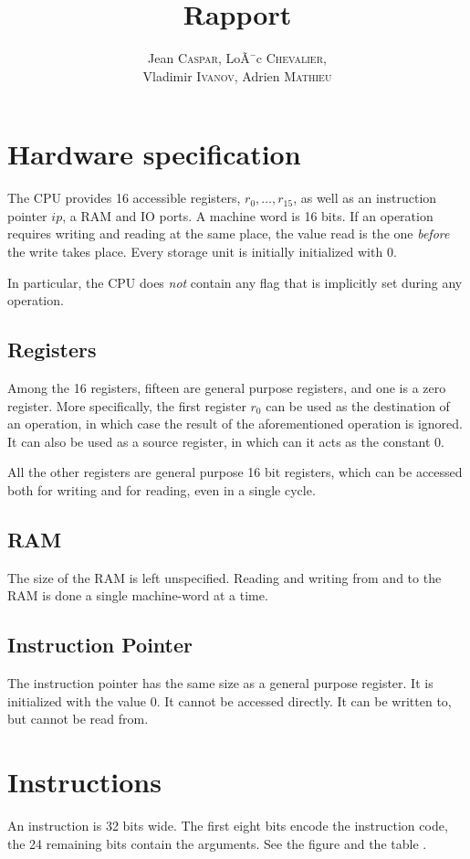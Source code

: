 \documentclass{scrartcl}
\title{Rapport}
\author{%
  Jean \textsc{Caspar},
  LoÃ¯c \textsc{Chevalier},\\
  Vladimir \textsc{Ivanov},
  Adrien \textsc{Mathieu}
}
\date{}
\begin{document}
\maketitle{}
\section*{Hardware specification}
The CPU provides 16 accessible registers, \(r_0,\ldots,r_{15}\), as
well as an instruction pointer \(ip\), a RAM and IO ports. A machine
word is 16 bits. If an operation requires writing and reading at the
same place, the value read is the one \emph{before} the write takes
place. Every storage unit is initially initialized with \(0\).\par
In particular, the CPU does \emph{not} contain any flag that is
implicitly set during any operation.
\subsection*{Registers}
Among the 16 registers, fifteen are general purpose registers, and
one is a zero register. More specifically, the first register \(r_0\)
can be used as the destination of an operation, in which case the result
of the aforementioned operation is ignored. It can also be used as a
source register, in which can it acts as the constant \(0\).\par
All the other registers are general purpose 16 bit registers, which
can be accessed both for writing and for reading, even in a single
cycle.
\subsection*{RAM}
The size of the RAM is left unspecified. Reading and writing from and
to the RAM is done a single machine-word at a time.
\subsection*{Instruction Pointer}
The instruction pointer has the same size as a general purpose
register. It is initialized with the value \(0\). It cannot be
accessed directly. It can be written to, but cannot be read from.

\section*{Instructions}
An instruction is 32 bits wide. The first eight bits encode the
instruction code, the 24 remaining bits contain the arguments. See
the figure  and the table .
\end{document}
